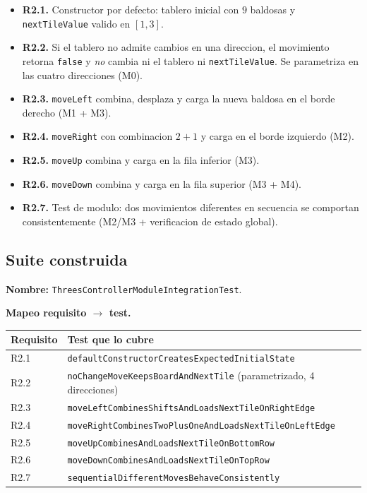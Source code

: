 \documentclass[12pt,a4paper]{article}
\begin{document}
\begin{itemize}
  \item \textbf{R2.1.} Constructor por defecto: tablero inicial con $9$ baldosas y
  \texttt{nextTileValue} valido en $[1, 3]$.
  \item \textbf{R2.2.} Si el tablero no admite cambios en una direccion, el movimiento
  retorna \texttt{false} y \emph{no} cambia ni el tablero ni \texttt{nextTileValue}. Se
  parametriza en las cuatro direcciones (M0).
  \item \textbf{R2.3.} \texttt{moveLeft} combina, desplaza y carga la nueva baldosa en el
  borde derecho (M1 + M3).
  \item \textbf{R2.4.} \texttt{moveRight} con combinacion $2+1$ y carga en el borde
  izquierdo (M2).
  \item \textbf{R2.5.} \texttt{moveUp} combina y carga en la fila inferior (M3).
  \item \textbf{R2.6.} \texttt{moveDown} combina y carga en la fila superior (M3 + M4).
  \item \textbf{R2.7.} Test de modulo: dos movimientos diferentes en secuencia se comportan
  consistentemente (M2/M3 + verificacion de estado global).
\end{itemize}

\subsection{Suite construida}

\textbf{Nombre:} \texttt{ThreesControllerModuleIntegrationTest}.

\textbf{Mapeo requisito $\to$ test.}

\begin{center}
\begin{tabular}{ll}
\toprule
Requisito & Test que lo cubre \\
\midrule
R2.1 & \texttt{defaultConstructorCreatesExpectedInitialState} \\
R2.2 & \texttt{noChangeMoveKeepsBoardAndNextTile} (parametrizado, 4 direcciones) \\
R2.3 & \texttt{moveLeftCombinesShiftsAndLoadsNextTileOnRightEdge} \\
R2.4 & \texttt{moveRightCombinesTwoPlusOneAndLoadsNextTileOnLeftEdge} \\
R2.5 & \texttt{moveUpCombinesAndLoadsNextTileOnBottomRow} \\
R2.6 & \texttt{moveDownCombinesAndLoadsNextTileOnTopRow} \\
R2.7 & \texttt{sequentialDifferentMovesBehaveConsistently} \\
\bottomrule
\end{tabular}
\end{center}
\end{document}
